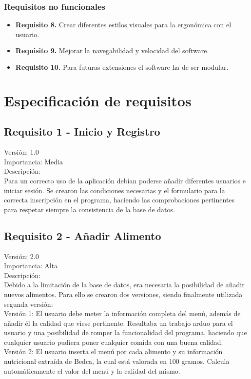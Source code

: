 \subsubsection{Requisitos no funcionales}
\begin{itemize}
\item \textbf{Requisito 8.} Crear diferentes estilos visuales para la ergonómica con el usuario.
\item \textbf{Requisito 9.} Mejorar la navegabilidad y velocidad del software.
\item \textbf{Requisito 10.} Para futuras extensiones el software ha de ser modular.
\end{itemize}
\section{Especificación de requisitos}
\subsection{Requisito 1 - Inicio y Registro}
Versión: 1.0\\
Importancia: Media\\
Descripción:\\
Para un correcto uso de la aplicación debían poderse añadir diferentes usuarios e iniciar sesión. Se crearon las condiciones necesarias y el formulario para la correcta inscripción en el programa, haciendo las comprobaciones pertinentes para respetar siempre la consistencia de la base de datos.

\subsection{Requisito 2 - Añadir Alimento}
Versión: 2.0\\
Importancia: Alta\\
Descripción:\\
Debido a la limitación de la base de datos, era necesaria la posibilidad de añadir nuevos alimentos. Para ello se crearon dos versiones, siendo finalmente utilizada segunda versión:\\
Versión 1: El usuario debe meter la información completa del menú, además de añadir él la calidad que viese pertinente. Resultaba un trabajo arduo para el usuario y una posibilidad de romper la funcionalidad del programa, haciendo que cualquier usuario pudiera poner cualquier comida con una buena calidad.\\
Versión 2: El usuario inserta el menú por cada alimento y su información nutricional extraída de Bedca, la cual está valorada en 100 gramos. Calcula automáticamente el valor del menú y la calidad del mismo.
